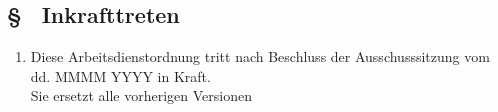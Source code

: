 \subsection{§ \theaoparagraphcounter\ Inkrafttreten} \label{ao:par:inkrafttreten}
\begin{enumerate}
    \item \label{ao:abs:01jlln} Diese Arbeitsdienstordnung tritt nach Beschluss der Ausschusssitzung vom dd. MMMM YYYY in Kraft. \\
    Sie ersetzt alle vorherigen Versionen
\end{enumerate}